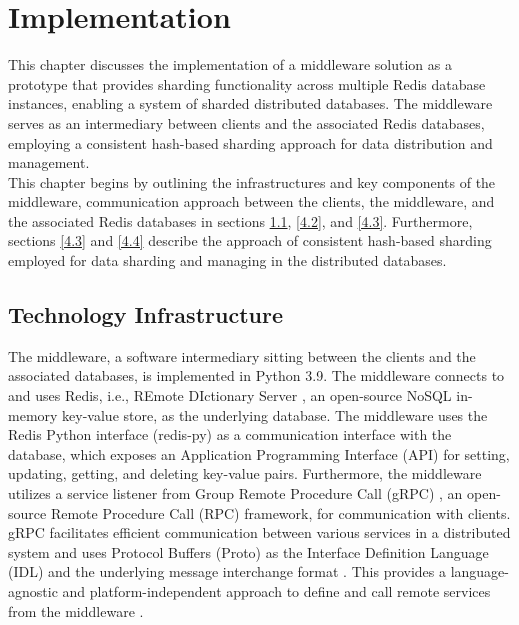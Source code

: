 
\chapter{Implementation}\label{ch:implementation}
This chapter discusses the implementation of a middleware solution as a prototype that provides sharding functionality across multiple Redis database instances, enabling a system of sharded distributed databases. The middleware serves as an intermediary between clients and the associated Redis databases, employing a consistent hash-based sharding approach for data distribution and management. \\

\noindent This chapter begins by outlining the infrastructures and key components of the middleware, communication approach between the clients, the middleware, and the associated Redis databases in sections \ref{techStack}, \ref{4.2}, and \ref{4.3}. Furthermore, sections \ref{4.3} and \ref{4.4} describe the approach of consistent hash-based sharding employed for data sharding and managing in the distributed databases.


\section{Technology Infrastructure}
\label{techStack}
The middleware, a software intermediary sitting between the clients and the associated databases, is implemented in Python 3.9. The middleware connects to and uses Redis, i.e., REmote DIctionary Server \cite{redis}, an open-source NoSQL in-memory key-value store, as the underlying database. The middleware uses the Redis Python interface (redis-py) \cite{redisPY} as a communication interface with the database, which exposes an Application Programming Interface (API) for setting, updating, getting, and deleting key-value pairs. Furthermore, the middleware utilizes a service listener from Group Remote Procedure Call (gRPC) \cite{grpc}, an open-source Remote Procedure Call (RPC) framework, for communication with clients. gRPC facilitates efficient communication between various services in a distributed system and uses Protocol Buffers (Proto) as the Interface Definition Language (IDL) and the underlying message interchange format \cite{wang1993grpc}. This provides a language-agnostic and platform-independent approach to define and call remote services from the middleware \cite{chamas2017comparing}. \\

